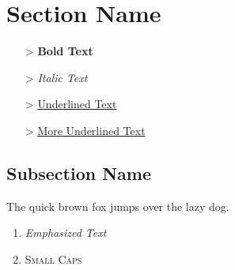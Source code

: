 \documentclass[11pt]{article}
\begin{document}
	\section{Section Name}
		\begin{itemize}
			\item[>] \textbf{Bold Text}
			\item[>] \textit{Italic Text}
			\item[>] \underline{Underlined Text}
			\item[>] \underline{More Underlined Text}
		\end{itemize}
		\subsection{Subsection Name}
			The quick brown fox jumps over the lazy dog.
			\begin{enumerate}
				\item \emph{Emphasized Text}
				\item \textsc{Small Caps}
			\end{enumerate}
\end{document}
